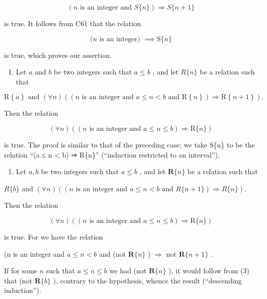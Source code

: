 \[
(n \text {   is   an   integer   and   } S \{n \}) \Longrightarrow S \{n + 1 \}
\]

is true. It follows from C61 that the relation

\[
(n \text {   is   an   integer) } \implies \mathrm{S} \{n \}
\]

is true, which proves our assertion.

\begin{enumerate}
\def\labelenumi{(\arabic{enumi})}
\setcounter{enumi}{2}
\tightlist
\item
  Let \(a\) and \(b\) be two integers such that \(a \leqslant b\) , and let \(R\{n\}\) be a relation such that
\end{enumerate}

\[
\mathrm{R} \left\{a \right\} \text {   and   } (\forall n) ((n \text {   is   an   integer   and   } a \leqslant n <   b \text {   and   } \mathrm{R} \left\{n \right\}) \Longrightarrow \mathrm{R} \left\{n + 1 \right\}).
\]

Then the relation

\[
(\forall n) ((n \text {   is   an   integer   and   } a \leqslant n \leqslant b) \Longrightarrow \mathrm{R} \{n \})
\]

is true. The proof is similar to that of the preceding case; we take S\{n\} to be the relation ``(a ≤ n \textless{} b) ⇒ R\{n\}'' (``induction restricted to an interval'').

\begin{enumerate}
\def\labelenumi{(\arabic{enumi})}
\setcounter{enumi}{3}
\tightlist
\item
  Let \(a, b\) be two integers such that \(a \leqslant b\) , and let \(\mathbf{R}\{n\}\) be a relation such that
\end{enumerate}

\(R\{b\}\) and \((\forall n)((n \text{ is an integer and } a \leqslant n < b \text{ and } R\{n + 1\}) \Longrightarrow R\{n\}).\)

Then the relation

\[
(\forall n) ((n \text {   is   an   integer   and   } a \leqslant n \leqslant b) \Longrightarrow \mathrm{R} \{n \})
\]

is true. For we have the relation

(n is an integer and \(a \leqslant n < b\) and (not \(\mathbf{R}\{n\}\) ) \(\Longrightarrow\) not \(\mathbf{R}\{n + 1\}\) .

If for some \(n\) such that \(a \leqslant n \leqslant b\) we had (not \(\mathbf{R}\{n\}\) ), it would follow from (3) that (not \(\mathbf{R}\{b\}\) ), contrary to the hypothesis, whence the result (``descending induction'').

